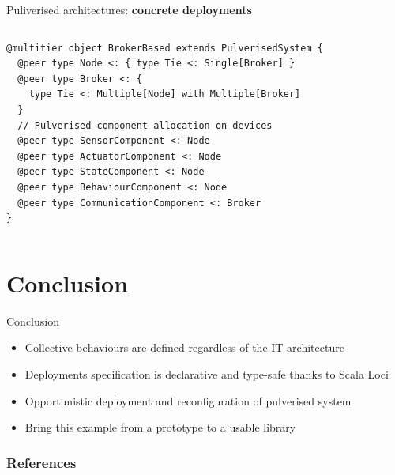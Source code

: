 \documentclass[aspectratio=169]{beamer}
\begin{document}
\begin{frame}[fragile]{Puliverised architectures: \textbf{concrete deployments}}
  \begin{columns}
    \begin{column}{0.7\textwidth}
      \begin{cardTiny}
        \begin{verbatim}
@multitier object BrokerBased extends PulverisedSystem {
  @peer type Node <: { type Tie <: Single[Broker] }
  @peer type Broker <: { 
    type Tie <: Multiple[Node] with Multiple[Broker] 
  }
  // Pulverised component allocation on devices
  @peer type SensorComponent <: Node
  @peer type ActuatorComponent <: Node
  @peer type StateComponent <: Node
  @peer type BehaviourComponent <: Node
  @peer type CommunicationComponent <: Broker
}
        \end{verbatim}
      \end{cardTiny}
    \end{column}
    \begin{column}{0.3\textwidth}
    \end{column}

  \end{columns}
\end{frame}

\section{Conclusion}
\begin{frame}{Conclusion}
\begin{card}[Benefits]
\begin{itemize}
  \item<1-> Collective behaviours are defined regardless of the IT architecture
  \item<2-> Deployments specification is declarative and type-safe thanks to Scala Loci
\end{itemize}
\end{card}
\pause
\begin{card}
\begin{itemize}
  \item <3-> Opportunistic deployment and reconfiguration of pulverised system
  \item <4-> Bring this example from a prototype to a usable library
\end{itemize}
\end{card}
\end{frame}

\begin{frame}[allowframebreaks]
\frametitle{References}
%
% 
\printbibliography
\end{frame}
\end{document}
